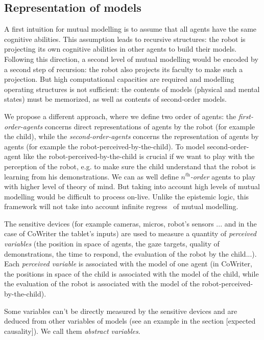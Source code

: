 \documentclass[conference]{IEEEtran}
\begin{document}
\subsection{Representation of models}
A first intuition for mutual modelling is to assume that all agents have the same cognitive abilities. This assumption leads to recursive structures: the robot is projecting its own cognitive abilities in other agents to build their models.  Following this direction, a second level of mutual modelling would be encoded by a second step of recursion: the robot also projects its faculty to make such a projection. But high computational capacities are required and modelling operating structures is not sufficient: the contents of models (physical and mental states) must be memorized, as well as contents of second-order models. 

We propose a different approach, where we define two order of agents: the \textit{first-order-agents} concerns direct representations of agents by the robot (for example the child), while the \textit{second-order-agents} concerns the representation of agents by agents (for example the robot-perceived-by-the-child). To model second-order-agent like the robot-perceived-by-the-child is crucial if we want to play with the perception of the robot, e.g. to make sure the child understand that the robot is learning from his demonstrations. We can as well define \textit{$n^{\textit{th}}$-order} agents to play with higher level of theory of mind. But taking into account high levels of mutual modelling would be difficult to process on-live. Unlike the epistemic logic, this framework will not take into account infinite regress~\cite{clark1991grounding} of mutual modelling. 

The sensitive devices (for example cameras, micros, robot's sensors ... and in the case of CoWriter the tablet's inputs) are used to measure a quantity of \textit{perceived variables} (the position in space of agents, the gaze targets, quality of demonstrations, the time to respond, the evaluation of the robot by the child...). Each \textit{perceived variable} is associated with the model of one agent (in CoWriter, the positions in space of the child is associated with the model of the child, while the evaluation of the robot is associated with the model of the robot-perceived-by-the-child). 

Some variables can't be directly measured by the sensitive devices and are deduced from other variables of models (see an example in the section [expected causality]). We call them \textit{abstract variables}. 
\end{document}
